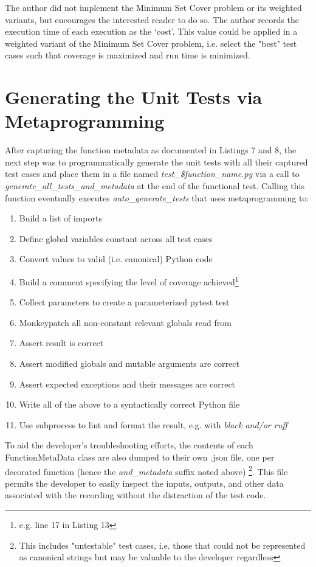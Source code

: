 \documentclass[10pt, conference]{IEEEtran}
\begin{document}
The author did not implement 
the Minimum Set Cover problem or its weighted variants, but encourages 
the interested reader to do so.  The author records the execution time of each 
execution as the \lq cost\rq. This value could be applied in a weighted 
variant of the Minimum Set Cover problem, i.e. select the "best" test cases
such that coverage is maximized and run time is minimized.

\section{Generating the Unit Tests via Metaprogramming}\label{sec:generating-tests}

After capturing the function metadata as documented in Listings 7 and 8, 
the next step was to programmatically generate the unit tests with all their 
captured test cases and place them in a file named 
\textit{test\_\$function\_name.py}
via a call to \textit{generate\_all\_tests\_and\_metadata} at the end of 
the functional test.
Calling this function eventually executes \textit{auto\_generate\_tests} 
that uses metaprogramming to:
\begin{enumerate}
  \item Build a list of imports
  \item Define global variables constant across all test cases
  \item Convert values to valid (i.e. canonical) Python code
  \item Build a comment specifying the level of coverage achieved\footnote{e.g. line 17 in Listing 13}
  \item Collect parameters to create a parameterized pytest test
  \item Monkeypatch all non-constant relevant globals read from
  \item Assert result is correct
  \item Assert modified globals and mutable arguments are correct
  \item Assert expected exceptions and their messages are correct
  \item Write all of the above to a syntactically correct Python file
  \item Use subprocess to lint and format the result, e.g. with \textit{black and/or ruff}
\end{enumerate}

To aid the developer's troubleshooting efforts, the contents of each FunctionMetaData
class are also dumped to their own .json file, one per decorated function (hence
the \textit{and\_metadata} suffix noted above) \footnote{This includes 
"untestable" test cases, i.e. those that could not be represented as canonical strings
but may be valuable to the developer regardless}.  This file permits the 
developer to easily inspect the inputs, outputs, and other data
associated with the recording without the distraction of the test code.
\end{document}
